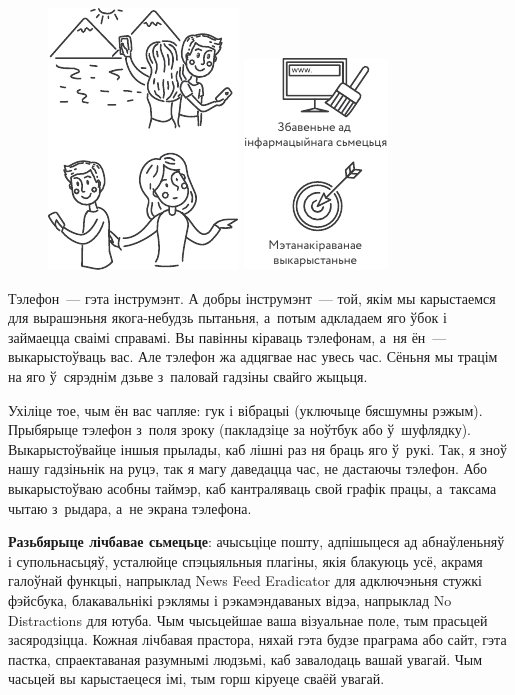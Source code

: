\begin{figure}[htb!]
  \centering
  \includegraphics[scale=1.5]{willpower/ch13/10.pdf}\bigskip

  \includegraphics[scale=1.5]{willpower/ch13/11.pdf}
\end{figure}


Тэлефон~--- гэта інструмэнт. А добры інструмэнт~--- той, якім мы карыстаемся для вырашэньня якога-небудзь пытаньня, а~потым адкладаем яго ўбок і займаецца сваімі справамі. Вы павінны кіраваць тэлефонам, а~ня ён~--- выкарыстоўваць вас. Але тэлефон жа адцягвае нас увесь час. Сёньня мы трацім на яго ў~сярэднім дзьве з~паловай гадзіны свайго жыцьця.

Ухіліце тое, чым ён вас чапляе: гук і вібрацыі (уключыце бясшумны рэжым). Прыбярыце тэлефон з~поля зроку (пакладзіце за ноўтбук або ў~шуфлядку). Выкарыстоўвайце іншыя прылады, каб лішні раз ня браць яго ў~рукі. Так, я зноў нашу гадзіньнік на руцэ, так я магу даведацца час, не дастаючы тэлефон. Або выкарыстоўваю асобны таймэр, каб кантраляваць свой графік працы, а~таксама чытаю з~рыдара, а~не экрана тэлефона.

\textbf{Разьбярыце лічбавае сьмецьце}: ачысьціце пошту, адпішыцеся ад абнаўленьняў і супольнасьцяў, усталюйце спэцыяльныя плагіны, якія блакуюць усё, акрамя галоўнай функцыі, напрыклад News Feed Eradicator для адключэньня стужкі фэйсбука, блакавальнікі рэклямы і рэкамэндаваных відэа, напрыклад No Distractions для ютуба. Чым чысьцейшае ваша візуальнае поле, тым прасьцей засяродзіцца. Кожная лічбавая прастора, няхай гэта будзе праграма або сайт, гэта пастка, спраектаваная разумнымі людзьмі, каб завалодаць вашай увагай. Чым часьцей вы карыстаецеся імі, тым горш кіруеце сваёй увагай.


